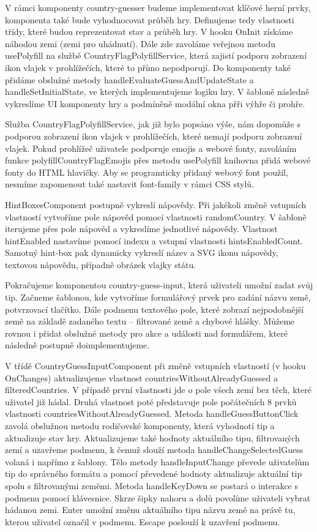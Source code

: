 V rámci komponenty country-guesser budeme implementovat klíčové herní prvky, komponenta také bude vyhodnocovat průběh hry. 
Definujeme tedy vlastnosti třídy, které budou reprezentovat stav a průběh hry. V hooku OnInit získáme náhodou zemi (zemi pro uhádnutí). 
Dále zde zavoláme veřejnou metodu usePolyfill na službě CountryFlagPolyfillService, která zajistí podporu zobrazení ikon vlajek v prohlížečích, které to přímo nepodporují.
Do komponenty také přidáme obslužné metody handleEvaluateGuessAndUpdateState a handleSetInitialState, ve kterých implementujeme logiku hry. 
V šabloně následně vykreslíme UI komponenty hry a podmíněně modální okna přři výhře či prohře.

Služba CountryFlagPolyfillService, jak již bylo popsáno výše, nám dopomůže s podporou zobrazení ikon vlajek v prohlížečích, které nemají podporu zobrazení vlajek. 
Pokud prohlížeč uživatele podporuje emojis a webové fonty, zavoláním funkce polyfillCountryFlagEmojis přes metodu usePolyfill knihovna přidá webové fonty do HTML hlavičky.
Aby se programticky přidaný webový font použil, nesmíme zapomenout také nastavit font-family v rámci CSS stylů. 

HintBoxesComponent postupně vykreslí nápovědy. Při jakékoli změně vstupních vlastností vytvoříme pole nápověd pomocí vlastnosti randomCountry. 
V šabloně iterujeme přes pole nápověd a vykreslíme jednotlivé nápovědy. Vlastnost hintEnabled nastavíme pomocí indexu a vstupní vlastnosti hintsEnabledCount. 
Samotný hint-box pak dynamicky vykreslí název a SVG ikonu nápovědy, textovou nápovědu, případně obrázek vlajky státu.

Pokračujeme komponentou country-guess-input, která uživateli umožní zadat svůj tip. 
Začneme šablonou, kde vytvoříme formulářový prvek pro zadání názvu země, potvrzovací tlačítko. 
Dále podmenu textového pole, které zobrazí nejpodobnější země na základě zadaného textu -- filtrované země a chybové hlášky. 
Můžeme rovnou i přidat obslužné metody pro akce a události nad formulářem, které následně postupně doimplementujeme.

V třídě CountryGuessInputComponent při změně vstupních vlastností (v hooku OnChanges) aktualizujeme vlastnost countriesWithoutAlreadyGuessed a filteredCountries. 
V případě první vlastnosti jde o pole všech zemí bez těch, které uživatel již hádal. Druhá vlastnost poté představuje pole počátečních 8 prvků vlastnosti countriesWithoutAlreadyGuessed. 
Metoda handleGuessButtonClick zavolá obslužnou metodu rodičovské komponenty, která vyhodnotí tip a aktualizuje stav hry. 
Aktualizujeme také hodnoty aktuálního tipu, filtrovaných zemí a uzavřeme podmenu, k čemuž slouží metoda handleChangeSelectedGuess volaná i napřímo z šablony. 
Tělo metody handleInputChange převede uživatelům tip do správného formátu a pomocí převedené hodnoty aktualizuje aktuální tip spolu s filtrovanými zeměmi.
Metoda handleKeyDown se postará o interakce s podmenu pomocí klávesnice. Skrze šipky nahoru a dolů povolíme uživateli vybrat hádanou zemi. 
Enter umožní změnu aktuálního tipu názvu země na právě tu, kterou uživatel označil v podmenu. Escape poslouží k uzavření podmenu.

